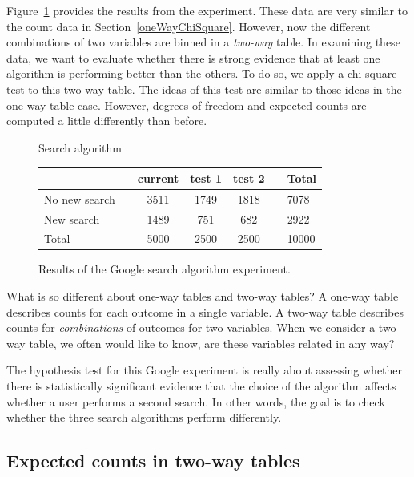Figure~\ref{googleSearchAlgorithmByAlgorithmAndPerformanceWithTotals} provides the results from the experiment. These data are very similar to the count data in Section~\ref{oneWayChiSquare}. However, now the different combinations of two variables are binned in a \emph{two-way} table. In examining these data, we want to evaluate whether there is strong evidence that at least one algorithm is performing better than the others. To do so, we apply a chi-square test to this two-way table. The ideas of this test are similar to those ideas in the one-way table case. However, degrees of freedom and expected counts are computed a little differently than before.

\begin{figure}[h]
\centering
\quad \quad \quad \quad Search algorithm \\
\begin{tabular}{ll ccc ll}
\hline
 & \hspace{1mm} & current & test 1 & test 2 & \hspace{1mm} & Total \\
\hline
No new search				   & & 3511    & 1749 & 1818 & 				& 7078 \\
New search				   & & 1489    & 751	& 682    &				& 2922 \\
\hline
Total						   & & 5000    & 2500 & 2500 & 				& 10000 \\
\hline
\end{tabular}
\caption{Results of the Google search algorithm experiment.}
\label{googleSearchAlgorithmByAlgorithmAndPerformanceWithTotals}
\end{figure}

\begin{onebox}{What is so different about one-way tables and two-way tables?}
A one-way table describes counts for each outcome in a single variable. A two-way table describes counts for \emph{combinations} of outcomes for two variables. When we consider a two-way table, we often would like to know, are these variables related in any way?\end{onebox}

The hypothesis test for this Google experiment is really about assessing whether there is statistically significant evidence that the choice of the algorithm affects whether a user performs a second search. In other words, the goal is to check whether the three search algorithms perform differently.


\subsection{Expected counts in two-way tables}

